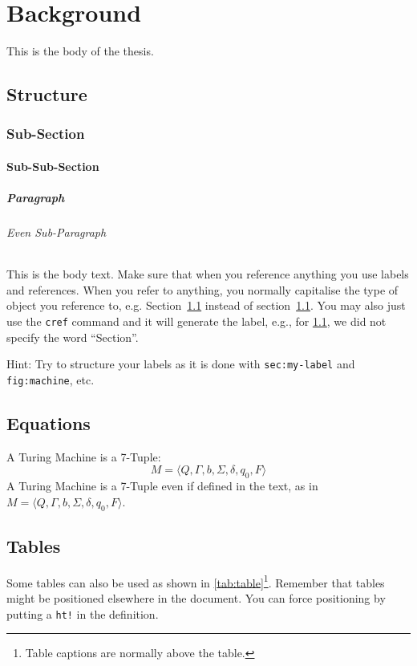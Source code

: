 \chapter{Background}

This is the body of the thesis.

\section{Structure}
\label{sec:my-label}

\subsection{Sub-Section}

\subsubsection{Sub-Sub-Section}

\paragraph{Paragraph}

\subparagraph{Even Sub-Paragraph}

This is the body text. Make sure that when you reference anything you use labels and references. When you refer to anything, you normally capitalise the type of object you reference to, e.g. Section~\ref{sec:my-label} instead of section~\ref{sec:my-label}. You may also just use the \texttt{cref} command and it will generate the label, e.g., for \cref{sec:my-label}, we did not specify the word ``Section''.

Hint: Try to structure your labels as it is done with \texttt{sec:my-label} and \texttt{fig:machine}, etc.



\section{Equations}
A Turing Machine is a 7-Tuple:
\begin{equation}
    M = \langle Q, \Gamma, b, \Sigma, \delta, q_0, F \rangle
\end{equation}
A Turing Machine is a 7-Tuple even if defined in the text, as in $M = \langle Q, \Gamma, b, \Sigma, \delta, q_0, F \rangle$.




\section{Tables}
Some tables can also be used as shown in \cref{tab:table}\footnote{Table captions are normally above the table.}. Remember that tables might be positioned elsewhere in the document. You can force positioning by putting a \texttt{ht!} in the definition.

